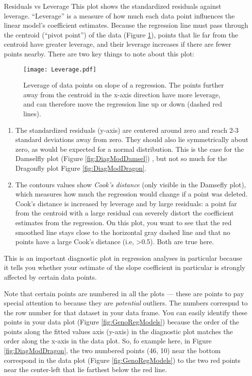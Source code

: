 \begin{compactdesc}
		\item[Residuals vs Leverage] This plot shows the standardized 
		residuals against leverage. ``Leverage'' is a measure of how much 
		each data point influences the linear model's coefficient 
		estimates. Because the regression line must pass through the 
		centroid (``pivot point'') of the data (Figure \ref{fig:Leverage}), 
		points that lie far from the centroid have greater leverage, and 
		their leverage increases if there are fewer points nearby. There 
		are two key things to note about this plot:
		\begin{figure} \centering
			\texttt{[image: Leverage.pdf]}
			\caption{Leverage of data points on slope of a regression. The 
			points further away from the centroid in the x-axis direction 
			have more leverage, and can therefore move the regression line up 
			or down (dashed red lines).}
			\label{fig:Leverage} 
		\end{figure}

		\begin{enumerate}
			\item The standardized residuals (y-axis) are centered around 
			zero and reach 2-3 standard deviations away from zero. They 
			should also lie symmetrically about zero, as would be expected 
			for a normal distribution. This is the case for the Damselfly 
			plot (Figure \ref{fig:DiagModDamsel}) , but not so much for the 
			Dragonfly plot Figure \ref{fig:DiagModDragon}. 
			\item The contours values show {\it Cook's distance} (only 
			visible in the Damsefly plot), which measures how much the 
			regression would change if a point was deleted. Cook's distance 
			is increased by leverage and by large residuals: a point far from 
			the centroid with a large residual can severely distort the 
			coefficient estimates from the regression. On this plot, you want to see that the red smoothed 
			line stays close to the horizontal gray dashed line and that no 
			points have a large Cook's distance (i.e, >0.5). Both are true 
			here.
		\end{enumerate}
		This is an important diagnostic plot in regression analyses in 
		particular because it tells you whether your estimate of the slope 
		coefficient in particular is strongly affected by certain data 
		points.  

\end{compactdesc}
Note that certain points are numbered in all the plots --- these are 
points to pay special attention to because they are {\it potential} 
outliers. The numbers correspnd to the row number for that dataset in 
your data frame. You can easily identify these points in your data plot 
(Figure \ref{fig:GenoRegModels}) because the order of the points along 
the fitted values axis (y-axis) in the diagnostic plot matches the 
order along the x-axis in the data plot. So, fo example here, in Figure 
\ref{fig:DiagModDragon}, the two numbered points (46, 10) near the 
bottom correspond in the data plot (Figure \ref{fig:GenoRegModels}) to 
the two red points near the center-left that lie farthest below the red 
line.

